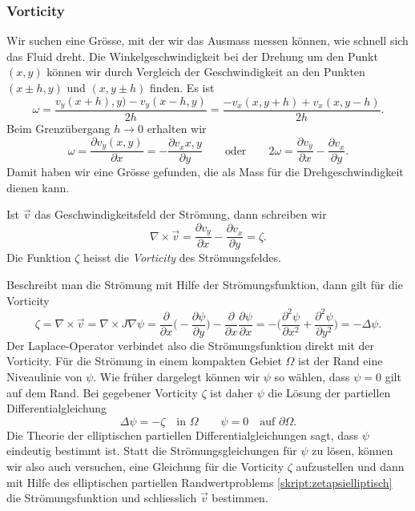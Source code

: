 \subsubsection{Vorticity}
Wir suchen eine Grösse, mit der wir das Ausmass messen können, wie schnell
sich das Fluid dreht.
Die Winkelgeschwindigkeit bei der Drehung um den Punkt $(x,y)$ können wir
durch Vergleich der Geschwindigkeit an den Punkten $(x\pm h,y)$ und
$(x,y\pm h)$ finden.
Es ist
\[
\omega
=
\frac{v_y(x+h),y) - v_y(x-h,y)}{2h}
=
\frac{-v_x(x,y+h) + v_x(x,y-h)}{2h}.
\]
Beim Grenzübergang $h\to 0$ erhalten wir
\[
\omega
=
\frac{\partial v_y(x,y)}{\partial x}
=
-\frac{\partial v_x{x,y}}{\partial y}
\qquad\text{oder}\qquad
2\omega
=
\frac{\partial v_y}{\partial x}-\frac{\partial v_x}{\partial y}.
\]
Damit haben wir eine Grösse gefunden, die als Mass für die Drehgeschwindigkeit
dienen kann.
\begin{definition}
Ist $\vec{v}$ das Geschwindigkeitsfeld der Strömung, dann schreiben wir
\[
\nabla\times\vec{v}
=
\frac{\partial v_y}{\partial x}-\frac{\partial v_x}{\partial y}
=
\zeta.
\]
Die Funktion $\zeta$ heisst die {\em Vorticity} des Strömungsfeldes.
\end{definition}

Beschreibt man die Strömung mit Hilfe der Strömungsfunktion, dann gilt
für die Vorticity
\begin{equation}
\zeta
=
\nabla\times\vec{v}
=
\nabla\times J\nabla\psi
=
\frac{\partial}{\partial x}
\biggl(-\frac{\partial\psi}{\partial y}\biggr)
-
\frac{\partial}{\partial x}
\frac{\partial\psi}{\partial x}
=
-\biggl(
\frac{\partial^2\psi}{\partial x^2}
+
\frac{\partial^2\psi}{\partial y^2}
\biggr)
=
-\Delta \psi.
\label{skript:stroemung-vorticity}
\end{equation}
Der Laplace-Operator verbindet also die Strömungsfunktion direkt mit der
Vorticity.
Für die Strömung in einem kompakten Gebiet $\Omega$ ist der Rand eine
Niveaulinie von $\psi$.
Wie früher dargelegt können wir $\psi$ so wählen, dass $\psi=0$ gilt auf
dem Rand.
Bei gegebener Vorticity $\zeta$ ist daher $\psi$ die Lösung der
partiellen Differentialgleichung
\begin{equation}
\Delta \psi = -\zeta\quad\text{in $\Omega$}
\qquad
\psi = 0\quad\text{auf $\partial\Omega$}.
\label{skript:zetapsielliptisch}
\end{equation}
Die Theorie der elliptischen partiellen Differentialgleichungen 
sagt, dass $\psi$ eindeutig bestimmt ist.
Statt die Strömungsgleichungen für $\psi$ zu lösen, können wir
also auch versuchen, eine Gleichung für die Vorticity $\zeta$
aufzustellen und dann mit Hilfe des elliptischen partiellen
Randwertproblems \eqref{skript:zetapsielliptisch} die Strömungsfunktion
und schliesslich $\vec{v}$ bestimmen.

